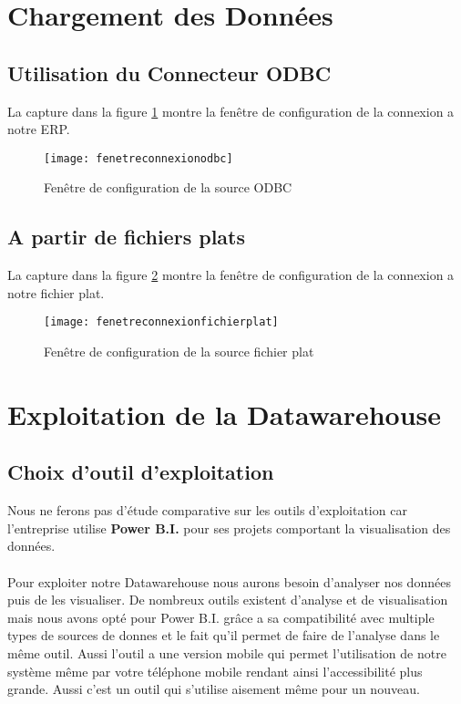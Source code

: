 \section{Chargement des Données}
\subsection{Utilisation du Connecteur ODBC}
La capture dans la figure \ref{fig:fenetreconnexionodbc} montre la fenêtre de configuration de la connexion a notre ERP.
\begin{figure}[H]
    \centering
    \texttt{[image: fenetreconnexionodbc]}
    \caption{Fenêtre de configuration de la source ODBC}
    \label{fig:fenetreconnexionodbc}
\end{figure}

\subsection{A partir de fichiers plats}
La capture dans la figure \ref{fig:fenetreconnexionfichierplat} montre la fenêtre de configuration de la connexion a notre fichier plat.
\begin{figure}[H]
    \centering
    \texttt{[image: fenetreconnexionfichierplat]}
    \caption{Fenêtre de configuration de la source fichier plat}
    \label{fig:fenetreconnexionfichierplat}
\end{figure}

\section{Exploitation de la Datawarehouse}
\subsection{Choix d'outil d'exploitation}
Nous ne ferons pas d'étude comparative sur les outils d'exploitation car l'entreprise utilise \textbf{Power B.I.} pour ses projets comportant la visualisation des données. 
\paragraph{}
Pour exploiter notre Datawarehouse nous aurons besoin d’analyser nos données puis de les visualiser. De nombreux outils existent d’analyse et de visualisation mais nous avons opté pour Power B.I. grâce a sa compatibilité avec multiple types de sources de donnes et le fait qu’il permet de faire de l’analyse dans le même outil. Aussi l’outil a une version mobile qui permet l’utilisation de notre système même par votre téléphone mobile rendant ainsi l’accessibilité plus grande.  Aussi c'est un outil qui s'utilise aisement même pour un nouveau.
